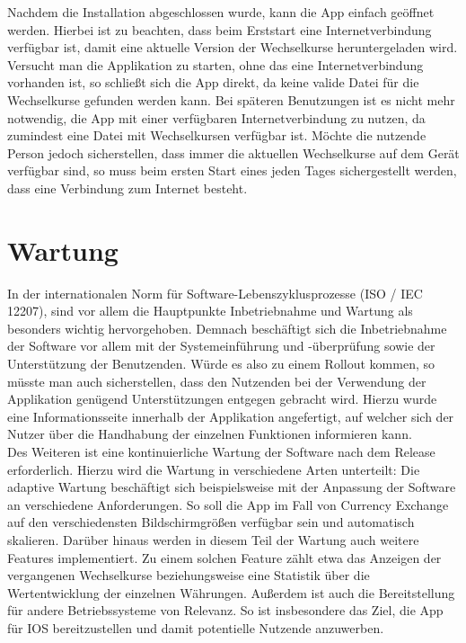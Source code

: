 \documentclass[conference]{IEEEtran}
\begin{document}
Nachdem die Installation abgeschlossen wurde, kann die App einfach geöffnet werden. Hierbei ist zu beachten, dass beim Erststart eine Internetverbindung verfügbar ist, damit eine aktuelle Version der Wechselkurse heruntergeladen wird. Versucht man die Applikation zu starten, ohne das eine Internetverbindung vorhanden ist, so schließt sich die App direkt, da keine valide Datei für die Wechselkurse gefunden werden kann. Bei späteren Benutzungen ist es nicht mehr notwendig, die App mit einer verfügbaren Internetverbindung zu nutzen, da zumindest eine Datei mit Wechselkursen verfügbar ist. Möchte die nutzende Person jedoch sicherstellen, dass immer die aktuellen Wechselkurse auf dem Gerät verfügbar sind, so muss beim ersten Start eines jeden Tages sichergestellt werden, 
dass eine Verbindung zum Internet besteht.

\section{Wartung}
In der internationalen Norm für Software-Lebenszyklusprozesse (ISO / IEC 12207), sind vor allem die Hauptpunkte Inbetriebnahme und Wartung als besonders wichtig hervorgehoben.
Demnach beschäftigt sich die Inbetriebnahme der Software vor allem mit der Systemeinführung und -überprüfung sowie der Unterstützung der Benutzenden. Würde es also zu einem Rollout kommen, so müsste man auch sicherstellen, dass den Nutzenden bei der Verwendung der Applikation genügend Unterstützungen entgegen gebracht wird. Hierzu wurde eine Informationsseite innerhalb der Applikation angefertigt, auf welcher sich der Nutzer über die Handhabung der einzelnen Funktionen informieren kann. \\
Des Weiteren ist eine kontinuierliche Wartung der Software nach dem Release erforderlich. Hierzu wird die Wartung in verschiedene Arten unterteilt: 
Die adaptive Wartung beschäftigt sich beispielsweise mit der Anpassung der Software an verschiedene Anforderungen. So soll die App im Fall von Currency Exchange auf den verschiedensten Bildschirmgrößen verfügbar sein und automatisch skalieren. Darüber hinaus werden in diesem Teil der Wartung auch weitere Features implementiert. Zu einem solchen Feature zählt etwa das Anzeigen der vergangenen Wechselkurse beziehungsweise eine Statistik über die Wertentwicklung der einzelnen Währungen. Außerdem ist auch die Bereitstellung für andere Betriebssysteme von Relevanz. So ist insbesondere das Ziel, die App für IOS bereitzustellen und damit potentielle Nutzende anzuwerben.\\
\end{document}
